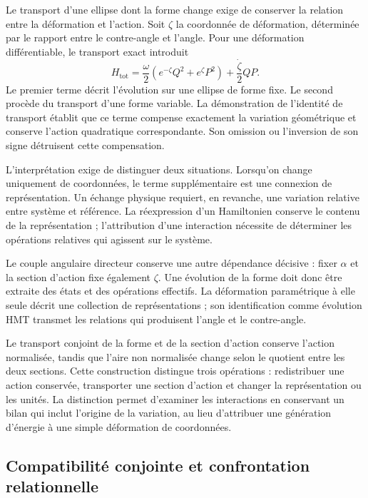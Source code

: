 Le transport d’une ellipse dont la forme change exige de conserver la relation
entre la déformation et l’action. Soit $\zeta$ la coordonnée de déformation,
déterminée par le rapport entre le contre-angle et l’angle. Pour une
déformation différentiable, le transport exact introduit
\begin{equation}
 H_{\mathrm{tot}}
 =\frac{\omega}{2}
   \left(e^{-\zeta}Q^2+e^\zeta P^2\right)
  +\frac{\dot\zeta}{2}QP.
 \label{eq:narrativa-hamiltoniano-transporte}
\end{equation}
Le premier terme décrit l’évolution sur une ellipse de forme fixe.
Le second procède du transport d’une forme variable. La démonstration
de l’identité de transport établit que ce terme compense
exactement la variation géométrique et conserve l’action quadratique
correspondante. Son omission ou l’inversion de son signe détruisent cette
compensation.

L’interprétation exige de distinguer deux situations. Lorsqu’on change
uniquement de coordonnées, le terme supplémentaire est une connexion de
représentation. Un échange physique requiert, en revanche, une variation
relative entre système et référence. La réexpression d’un Hamiltonien
conserve le contenu de la représentation ; l’attribution d’une interaction
nécessite de déterminer les opérations relatives qui agissent sur le système.

Le couple angulaire directeur conserve une autre dépendance décisive : fixer $\alpha$
et la section d’action fixe également $\zeta$. Une évolution de la forme
doit donc être extraite des états et des opérations effectifs. La
déformation paramétrique à elle seule décrit une collection de représentations ;
son identification comme évolution HMT transmet les relations qui produisent
l’angle et le contre-angle.

Le transport conjoint de la forme et de la section d’action conserve
l’action normalisée, tandis que l’aire non normalisée change selon
le quotient entre les deux sections. Cette construction distingue trois
opérations : redistribuer une action conservée, transporter une section
d’action et changer la représentation ou les unités. La distinction permet
d’examiner les interactions en conservant un bilan qui inclut l’origine de la
variation, au lieu d’attribuer une génération d’énergie à une simple déformation
de coordonnées.

\subsection{Compatibilité conjointe et confrontation relationnelle}
\label{subsec:narrativa-compatibilidad-conjunta}

